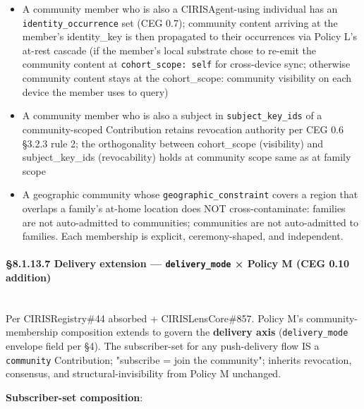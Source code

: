 \documentclass[10pt]{article}
\begin{document}
\begin{itemize}\setlength\itemsep{0pt}
\item A community member who is also a CIRISAgent-using individual has an \texttt{identity\_occurrence} set (CEG 0.7); community content arriving at the member's identity\_key is then propagated to their occurrences via Policy L's at-rest cascade (if the member's local substrate chose to re-emit the community content at \texttt{cohort\_scope: self} for cross-device sync; otherwise community content stays at the cohort\_scope: community visibility on each device the member uses to query)
\item A community member who is also a subject in \texttt{subject\_key\_ids} of a community-scoped Contribution retains revocation authority per CEG 0.6 §3.2.3 rule 2; the orthogonality between cohort\_scope (visibility) and subject\_key\_ids (revocability) holds at community scope same as at family scope
\item A geographic community whose \texttt{geographic\_constraint} covers a region that overlaps a family's at-home location does NOT cross-contaminate: families are not auto-admitted to communities; communities are not auto-admitted to families. Each membership is explicit, ceremony-shaped, and independent.
\end{itemize}


\paragraph{§8.1.13.7 Delivery extension — \texttt{delivery\_mode} × Policy M (CEG 0.10 addition)}\mbox{}\\


Per CIRISRegistry\#44 absorbed + CIRISLensCore\#857. Policy M's community-membership composition extends to govern the \textbf{delivery axis} (\texttt{delivery\_mode} envelope field per §4). The subscriber-set for any push-delivery flow IS a \texttt{community} Contribution; "subscribe = join the community"; inherits revocation, consensus, and structural-invisibility from Policy M unchanged.


\textbf{Subscriber-set composition}:
\end{document}
